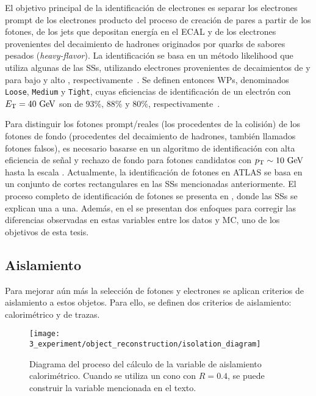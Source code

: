 El objetivo principal de la identificación de electrones es separar los electrones prompt de los electrones producto del proceso de creación de pares a partir de los fotones, de los jets que depositan energía en el \ac{ECAL} y de los electrones provenientes del decaimiento de hadrones originados por quarks de sabores pesados (\textit{heavy-flavor}). La identificación se basa en un método likelihood que utiliza algunas de las \acp{SS}, utilizando electrones provenientes de decaimientos de \jpsi y \Zboson para bajo y alto \et, respectivamente~\cite{ATLAS-EGamma-Performance-2024}. Se definen entonces \acp{WP}, denominados \texttt{Loose}, \texttt{Medium} y \texttt{Tight}, cuyas eficiencias de identificación de un electrón con \(E_{\text{T}}=40~\text{GeV}\) son de \(93\%, \, 88\%\) y \(80\%\), respectivamente~\cite{ATLAS-EGamma-Calibration-2015-2016}.


Para distinguir los fotones prompt/reales (los procedentes de la colisión) de los fotones de fondo (procedentes del decaimiento de hadrones, también llamados fotones falsos), es necesario basarse en un algoritmo de identificación con alta eficiencia de señal y rechazo de fondo para fotones candidatos con \(p_{\text{T}} \sim 10~\text{GeV}\) hasta la escala \tev.
Actualmente, la identificación de fotones en \ac{ATLAS} se basa en un conjunto de cortes rectangulares en las \acp{SS} mencionadas anteriormente.
El proceso completo de identificación de fotones se presenta en \Ch{\ref{ch:pid_ss}}, donde las \acp{SS} se explican una a una. Además, en el \Ch{\ref{ch:ss_corrections}} se presentan dos enfoques para corregir las diferencias observadas en estas variables entre los datos y \ac{MC}, uno de los objetivos de esta tesis.





\subsection{Aislamiento}
\label{subsec:objects:egamma:iso}

Para mejorar aún más la selección de fotones y electrones se aplican criterios de aislamiento a estos objetos. Para ello, se definen dos criterios de aislamiento: calorimétrico y de trazas. 

\begin{figure}[ht!]
    \centering
    \texttt{[image: 3\_experiment/object\_reconstruction/isolation\_diagram]}
    \caption{Diagrama del proceso del cálculo de la variable de aislamiento calorimétrico. Cuando se utiliza un cono con \(R=0.4\), se puede construir la variable \etconefo mencionada en el texto.}
    \label{fig:objects:egamma:iso:iso_diagram}
\end{figure}


